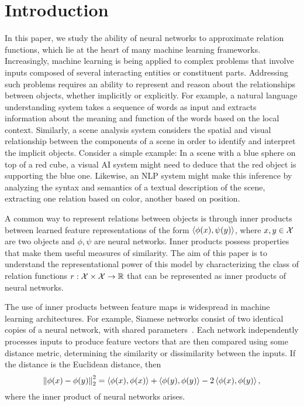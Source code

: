 \section{Introduction}\label{sec:intro}


In this paper, we study the ability of neural networks to approximate relation functions, which lie at the heart of many machine learning frameworks. Increasingly, machine learning is being applied to complex problems that involve inputs composed of several interacting entities or constituent parts. Addressing such problems requires an ability to represent and reason about the relationships between objects, whether implicitly or explicitly. For example, a natural language understanding system takes a sequence of words as input and extracts information about the meaning and function of the words based on the local context. Similarly, a scene analysis system considers the spatial and visual relationship between the components of a scene in order to identify and interpret the implicit objects. Consider a simple example: In a scene with a blue sphere on top of a red cube, a visual AI system might need to deduce that the red object is supporting the blue one.  Likewise, an NLP system might make this inference by analyzing the syntax and semantics of a textual description of the scene, extracting one relation based on color, another based on position.

A common way to represent relations between objects is through inner products between learned feature representations of the form $\left \langle \phi(x), \psi(y) \right\rangle$, where $x, y \in {\mathcal{X}}$ are two objects and $\phi, \psi$ are neural networks. Inner products possess properties that make them useful measures of similarity. The aim of this paper is to understand the representational power of this model by characterizing the class of relation functions $r: {\mathcal{X}} \times {\mathcal{X}} \to \mathbb{R}$ that can be represented as inner products of neural networks.

The use of inner products between feature maps is widespread in machine learning architectures. 
For example, Siamese networks consist of two identical copies of a neural network, with shared parameters~\parencite{rumelhartLearningRepresentationsBackpropagating1986,langTimedelayNeuralNetwork1988,bromleySignatureVerificationUsing1993,baldiNeuralNetworksFingerprint1993,chopraLearningSimilarityMetric2005,kochSiameseNeuralNetworks2015}. Each network independently processes inputs to produce feature vectors that are then compared using some distance metric, determining the similarity or dissimilarity between the inputs. If the distance is the Euclidean distance, then 
$$\left\lVert\phi(x) - \phi(y)\right\rVert_{2}^2 = \left \langle \phi(x), \phi(x) \right\rangle + \left \langle \phi(y), \phi(y) \right\rangle - 2 \left \langle \phi(x), \phi(y) \right\rangle,$$ 
where the inner product of neural networks arises.

